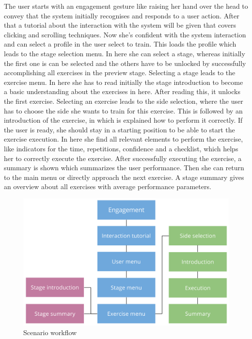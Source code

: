 The user starts with an engagement gesture like raising her hand over the head to convey that the system initially recognises and responds to a user action. After that a tutorial about the interaction with the system will be given that covers clicking and scrolling techniques. Now she's confident with the system interaction and can select a profile in the user select to train. This loads the profile which leads to the stage selection menu. In here she can select a stage, whereas initially the first one is can be selected and the others have to be unlocked by successfully accomplishing all exercises in the preview stage. Selecting a stage leads to the exercise menu. In here she has to read initially the stage introduction to become a basic understanding about the exercises in here. After reading this, it unlocks the first exercise. Selecting an exercise leads to the side selection, where the user has to choose the side she wants to train for this exercise. This is followed by an introduction of the exercise, in which is explained how to perform it correctly. If the user is ready, she should stay in a starting position to be able to start the exercise execution. In here she find all relevant elements to perform the exercise, like indicators for the time, repetitions, confidence and a checklist, which helps her to correctly execute the exercise. After successfully executing the exercise, a summary is shown which summarizes the user performance. Then she can return to the main menu or directly approach the next exercise. A stage summary gives an overview about all exercises with average performance parameters.

\begin{figure}[htb]
	\centering
	\begin{minipage}[t]{1\linewidth}
		\centering
		\includegraphics[width=0.8\linewidth]{Pictures/conceptScenarioFlow2}
		\caption{Scenario workflow}
		\label{fig:scenarioWorkflow}
	\end{minipage}
\end{figure}

